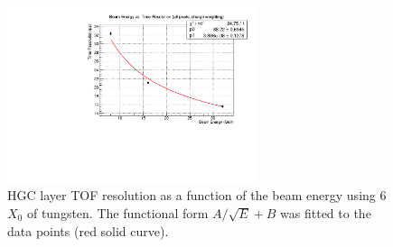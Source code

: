 \begin{figure}[h] 
\centering
\includegraphics[width=0.65\textwidth]{HGC/TOF_vs_beamEnergy_no_smearing.pdf} 
\caption{HGC layer TOF resolution as a function of the beam energy
  using 6$X_{0}$ of tungsten. The functional form $A/\sqrt{E} +
B$ was fitted to the data points (red solid curve).}  
\label{hgc:res_vs_beamEnergy} 
\end{figure}

